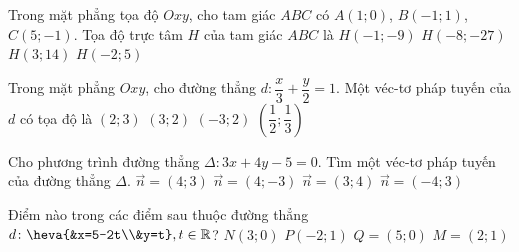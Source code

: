 \begin{ex}%
	Trong mặt phẳng tọa độ $Oxy$, cho tam giác $ABC$ có $A\left( 1;0 \right)$, $B\left( -1;1 \right)$, $C\left( 5;-1 \right)$. Tọa độ trực tâm $H$ của tam giác $ABC$ là
	\choice
	{ $H\left( -1;-9 \right)$}
	{\True $H\left( -8;-27 \right)$}
	{ $H\left( 3;14 \right)$}
	{ $H\left( -2;5 \right)$}
\end{ex}


\begin{ex}%
	Trong mặt phẳng $Oxy$, cho đường thẳng $d\colon \dfrac{x}{3}+\dfrac{y}{2}=1$. Một véc-tơ pháp tuyến của $d$ có tọa độ là
	\choice
	{\True $(2;3)$}
	{$(3;2)$}
	{ $(-3;2)$}
	{$\left(\dfrac{1}{2};\dfrac{1}{3}\right)$}
\end{ex}


\begin{ex}%
	Cho phương trình đường thẳng $\Delta \colon 3x+4y-5=0$. Tìm một véc-tơ pháp tuyến của đường thẳng $\Delta$.
	\choice
	{$\overrightarrow{n}=(4;3)$}
	{$\overrightarrow{n}=(4;-3)$}
	{\True $\overrightarrow{n}=(3;4)$}
	{$\overrightarrow{n}=(-4;3)$}
\end{ex}


\begin{ex}%
	Điểm nào trong các điểm sau thuộc đường thẳng $d\colon \heva{&x=5-2t\\&y=t}, t\in \mathbb{R}$?
	\choice
	{$N(3;0) $}
	{$P(-2;1) $}
	{\True $Q=(5;0) $}
	{$M=(2;1) $}
\end{ex}


